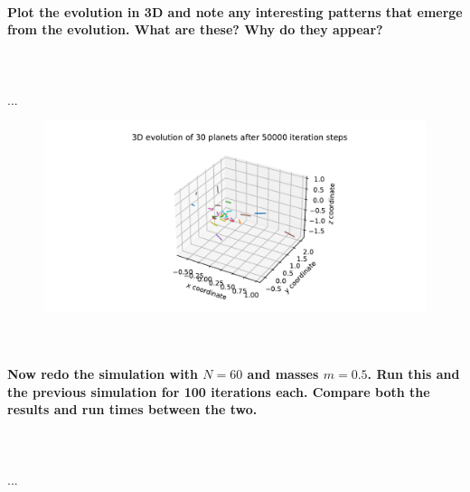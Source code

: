     \paragraph{Plot the evolution in 3D and note any interesting patterns that 
        emerge from the evolution. What are these? Why do they appear?
    } \ \\
        \\
        ...
        \begin{figure}[h!]
            \centering
            \includegraphics[width=\textwidth]{./figures/task2_30body_3D_new.pdf}
        \end{figure} \ \\ 

    \paragraph{Now redo the simulation with $N=60$ and masses $m=0.5$. Run this and 
        the previous simulation for 100 iterations each. Compare both the 
        results and run times between the two.
    } \ \\
        \\
        ...
